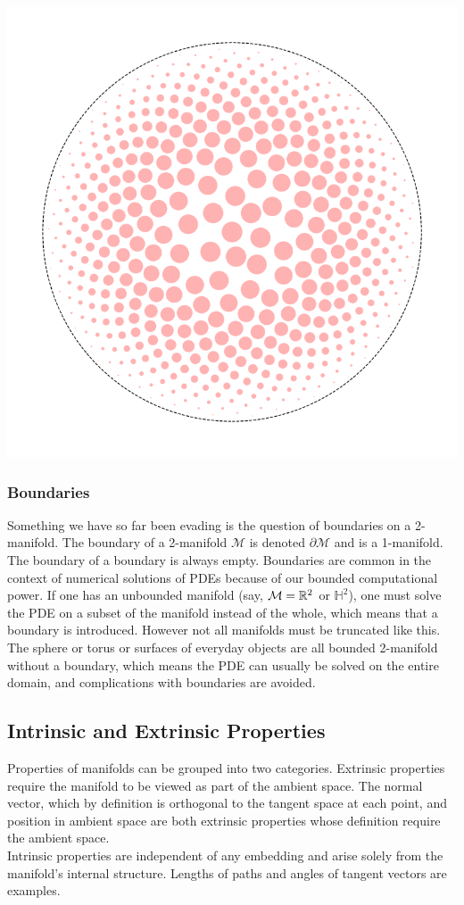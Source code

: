 {\begin{center}
        \includegraphics[width=0.8\columnwidth]{../images/hyperbolic_space_tissot.png}
    \end{center} 
}
\subsubsection*{Boundaries}
Something we have so far been evading is the question of boundaries on a 2-manifold. The boundary of a 2-manifold $\mathcal{M}$ is denoted $\partial \mathcal{M}$ and is a 1-manifold. The boundary of a boundary is always empty. Boundaries are common in the context of numerical solutions of PDEs because of our bounded computational power. If one has an unbounded manifold (say, $\mathcal{M} = \mathbb{R}^2$ or $\mathbb{H}^2$), one must solve the PDE on a subset of the manifold instead of the whole, which means that a boundary is introduced. However not all manifolds must be truncated like this. The sphere or torus or surfaces of everyday objects are all bounded 2-manifold without a boundary, which means the PDE can usually be solved on the entire domain, and complications with boundaries are avoided.

\subsection*{Intrinsic and Extrinsic Properties}
Properties of manifolds can be grouped into two categories. Extrinsic properties require the manifold to be viewed as part of the ambient space. The normal vector, which by definition is orthogonal to the tangent space at each point, and position in ambient space are both extrinsic properties whose definition require the ambient space. 
\\
Intrinsic properties are independent of any embedding and arise solely from the manifold's internal structure. Lengths of paths and angles of tangent vectors are examples.

